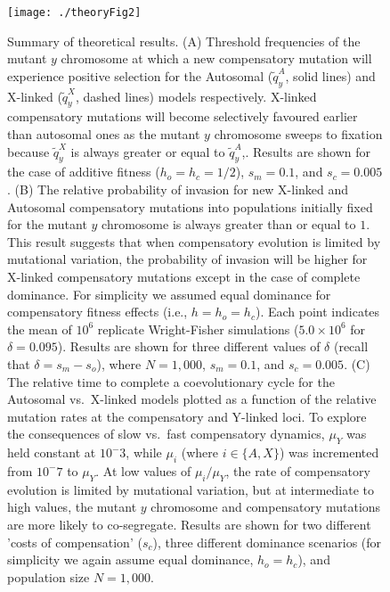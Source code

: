 \documentclass{article}
\begin{document}
\newpage
\begin{figure}[htbp]
\centering
\texttt{[image: ./theoryFig2]}
\caption{Summary of theoretical results. (A) Threshold frequencies of the mutant $y$ chromosome at which a new compensatory mutation will experience positive selection for the Autosomal ($\tilde{q}_y^A$, solid lines) and X-linked ($\tilde{q}_y^X$, dashed lines) models respectively. X-linked compensatory mutations will become selectively favoured earlier than autosomal ones as the mutant $y$ chromosome sweeps to fixation because $\tilde{q}_y^X$ is always greater or equal to $\tilde{q}_y^A$,. Results are shown for the case of additive fitness ($h_o = h_c = 1/2$), $s_m = 0.1$, and $s_c = 0.005$. (B) The relative probability of invasion for new X-linked and Autosomal compensatory mutations into populations initially fixed for the mutant $y$ chromosome is always greater than or equal to $1$. This result suggests that when compensatory evolution is limited by mutational variation, the probability of invasion will be higher for X-linked compensatory mutations except in the case of complete dominance. For simplicity we assumed equal dominance for compensatory fitness effects (i.e., $h = h_o = h_c$). Each point indicates the mean of $10^6$ replicate Wright-Fisher simulations ($5.0 \times 10^6$ for $\delta = 0.095$). Results are shown for three different values of $\delta$ (recall that $\delta = s_m - s_o$), where $N = 1,000$, $s_m = 0.1$, and $s_c = 0.005$. (C) The relative time to complete a coevolutionary cycle for the Autosomal vs.~X-linked models plotted as a function of the relative mutation rates at the compensatory and Y-linked loci. To explore the consequences of slow vs.~fast compensatory dynamics, $\mu_Y$ was held constant at $10^-3$, while $\mu_i$ (where $i \in \{A,X\}$) was incremented from $10^-7$ to $\mu_Y$. At low values of $\mu_i/\mu_Y$, the rate of compensatory evolution is limited by mutational variation, but at intermediate to high values, the mutant $y$ chromosome and compensatory mutations are more likely to co-segregate. Results are shown for two different 'costs of compensation' ($s_c$), three different dominance scenarios (for simplicity we again assume equal dominance, $h_o = h_c$), and population size $N = 1,000$.}
\label{fig:theoryFig}
\end{figure}

\end{document}
